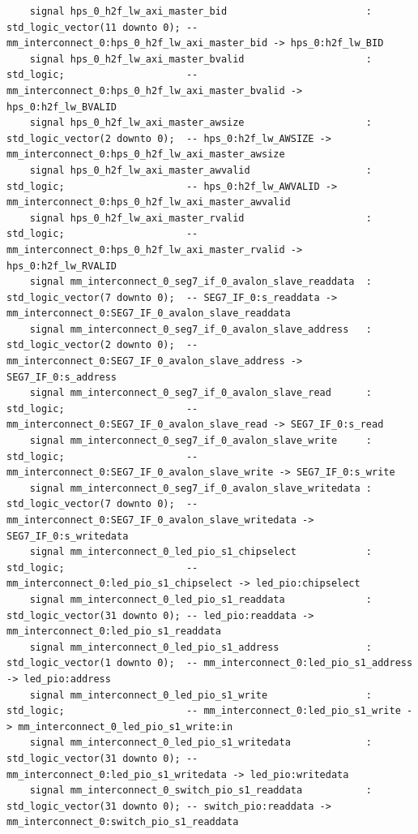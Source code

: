\documentclass[conference]{IEEEtran}
\begin{document}
\begin{lstlisting}
	signal hps_0_h2f_lw_axi_master_bid                        : std_logic_vector(11 downto 0); -- mm_interconnect_0:hps_0_h2f_lw_axi_master_bid -> hps_0:h2f_lw_BID
	signal hps_0_h2f_lw_axi_master_bvalid                     : std_logic;                     -- mm_interconnect_0:hps_0_h2f_lw_axi_master_bvalid -> hps_0:h2f_lw_BVALID
	signal hps_0_h2f_lw_axi_master_awsize                     : std_logic_vector(2 downto 0);  -- hps_0:h2f_lw_AWSIZE -> mm_interconnect_0:hps_0_h2f_lw_axi_master_awsize
	signal hps_0_h2f_lw_axi_master_awvalid                    : std_logic;                     -- hps_0:h2f_lw_AWVALID -> mm_interconnect_0:hps_0_h2f_lw_axi_master_awvalid
	signal hps_0_h2f_lw_axi_master_rvalid                     : std_logic;                     -- mm_interconnect_0:hps_0_h2f_lw_axi_master_rvalid -> hps_0:h2f_lw_RVALID
	signal mm_interconnect_0_seg7_if_0_avalon_slave_readdata  : std_logic_vector(7 downto 0);  -- SEG7_IF_0:s_readdata -> mm_interconnect_0:SEG7_IF_0_avalon_slave_readdata
	signal mm_interconnect_0_seg7_if_0_avalon_slave_address   : std_logic_vector(2 downto 0);  -- mm_interconnect_0:SEG7_IF_0_avalon_slave_address -> SEG7_IF_0:s_address
	signal mm_interconnect_0_seg7_if_0_avalon_slave_read      : std_logic;                     -- mm_interconnect_0:SEG7_IF_0_avalon_slave_read -> SEG7_IF_0:s_read
	signal mm_interconnect_0_seg7_if_0_avalon_slave_write     : std_logic;                     -- mm_interconnect_0:SEG7_IF_0_avalon_slave_write -> SEG7_IF_0:s_write
	signal mm_interconnect_0_seg7_if_0_avalon_slave_writedata : std_logic_vector(7 downto 0);  -- mm_interconnect_0:SEG7_IF_0_avalon_slave_writedata -> SEG7_IF_0:s_writedata
	signal mm_interconnect_0_led_pio_s1_chipselect            : std_logic;                     -- mm_interconnect_0:led_pio_s1_chipselect -> led_pio:chipselect
	signal mm_interconnect_0_led_pio_s1_readdata              : std_logic_vector(31 downto 0); -- led_pio:readdata -> mm_interconnect_0:led_pio_s1_readdata
	signal mm_interconnect_0_led_pio_s1_address               : std_logic_vector(1 downto 0);  -- mm_interconnect_0:led_pio_s1_address -> led_pio:address
	signal mm_interconnect_0_led_pio_s1_write                 : std_logic;                     -- mm_interconnect_0:led_pio_s1_write -> mm_interconnect_0_led_pio_s1_write:in
	signal mm_interconnect_0_led_pio_s1_writedata             : std_logic_vector(31 downto 0); -- mm_interconnect_0:led_pio_s1_writedata -> led_pio:writedata
	signal mm_interconnect_0_switch_pio_s1_readdata           : std_logic_vector(31 downto 0); -- switch_pio:readdata -> mm_interconnect_0:switch_pio_s1_readdata

\end{lstlisting}
\end{document}
